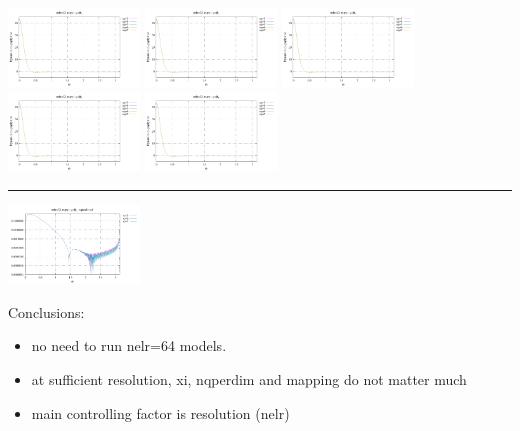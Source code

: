 \noindent
\includegraphics[width=3.5cm]{python_codes/fieldstone_152/RESULTS/exp2/d_t_64_m2}
\includegraphics[width=3.5cm]{python_codes/fieldstone_152/RESULTS/exp2/d_t_64_m3}
\includegraphics[width=3.5cm]{python_codes/fieldstone_152/RESULTS/exp2/d_t_64_m4}
\includegraphics[width=3.5cm]{python_codes/fieldstone_152/RESULTS/exp2/d_t_64_m5}
\includegraphics[width=3.5cm]{python_codes/fieldstone_152/RESULTS/exp2/d_t_64_m6}

\hrule

\includegraphics[width=3.5cm]{python_codes/fieldstone_152/RESULTS/exp2/vel_64_xi}


Conclusions:
\begin{itemize}
\item no need to run nelr=64 models.
\item at sufficient resolution, xi, nqperdim and mapping do not matter 
much 
\item main controlling factor is resolution (nelr)
\end{itemize}









